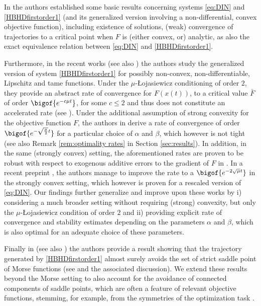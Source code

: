\documentclass[reqno]{amsart}
\theoremstyle{plain}
\theoremstyle{definition}
\theoremstyle{remark}
\newcommand{\VA}{\VAcomment}
\begin{document}
In \cite{alvarez2002second} the authors established some basic results concerning systems \eqref{eq:DIN} and \eqref{HBHDfirstorder1} (and its generalized version involving a non-differential, convex objective function), including existence of solutions, (weak) convergence of trajectories to a critical point when $F$ is (either convex, or) analytic, as also the exact equivalence relation between \eqref{eq:DIN} and \eqref{HBHDfirstorder1}.

Furthermore, in the recent works \cite{castera2021inertial} (see also \cite{maulen2024inertial}) the authors study the generalized version of system \eqref{HBHDfirstorder1} for possibly non-convex, non-differentiable, Lipschitz and tame functions.
Under the $\mu$-\L ojasiewicz conditioning of order $2$, they provide an abstract rate of convergence for $F(x(t))$, to a critical value $\bar{F}$ of order $\bigof{e^{-c\mu t}}$, for some $c\leq 2$ and thus does not constitute an accelerated rate (see \cite[Theorem $13$]{castera2023inertial}). Under the additional assumption of strong convexity for the objective function $F$, the authors in \cite{attouch2022first} derive a rate of convergence of order $\bigof{e^{-\sqrt{\frac{\mu}{2}}t}}$ for a particular choice of $\alpha$ and $\beta$, which however is not tight (see also Remark \ref{rem:optimality rates} in Section \ref{sec:results}). In addition, in the same (strongly convex) setting, the aforementioned rates are proven to be robust with respect to exogenous additive errors to the gradient of $F$ in \cite{attouch2021effect}. In a  recent preprint \cite{wang2025accelerated}, the authors manage to improve the rate to a  $\bigof{e^{-2\sqrt{\mu}t}}$ in the strongly convex setting, which however is proven for a rescaled version of \eqref{eq:DIN}. 
Our findings further generalize and improve upon these works by i) considering a much broader setting without requiring (strong) convexity, but only the $\mu$-\L ojasiewicz condition of order $2$ and ii) providing explicit rate of convergence and stability estimates depending on the parameters $\alpha$ and $\beta$, which is also optimal for an adequate choice of these parameters.  

 Finally in \cite{castera2023inertial} (see also \cite{maulen2024inertial}) the authors provide a result showing that the trajectory generated by \eqref{HBHDfirstorder1} almost surely avoids the set of strict saddle point of Morse functions (see \cite[Theorem \& Corollary $3.1$]{castera2024continuous} and the associated discussion). We extend these results beyond the Morse setting to also account for the avoidance of connected components of saddle points, which are often a feature of relevant objective functions, stemming, for example, from the symmetries of the optimization task \cite{simsek2021geometry}.
\end{document}
